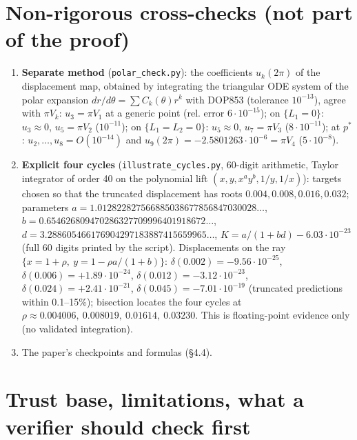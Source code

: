\documentclass[11pt,a4paper]{report}
\begin{document}
\section{Non-rigorous cross-checks (not part of the proof)}

\begin{enumerate}
\def\labelenumi{\arabic{enumi}.}
\tightlist
\item
  \textbf{Separate method} (\texttt{polar\_check.py}): the coefficients \(u_k(2\pi)\) of the displacement map, obtained
  by integrating the triangular ODE system of the polar expansion \(dr/d\theta=\sum C_k(\theta)r^k\) with DOP853
  (tolerance \(10^{-13}\)), agree with \(\pi V_k\): \(u_3=\pi V_1\) at a generic point (rel. error
  \(6\cdot10^{-15}\)); on \(\{L_1=0\}\): \(u_3\approx0\), \(u_5=\pi V_2\) (\(10^{-11}\)); on \(\{L_1=L_2=0\}\):
  \(u_5\approx0\), \(u_7=\pi V_3\) (\(8\cdot10^{-11}\)); at \(p^*\): \(u_2,\dots,u_8=O(10^{-14})\) and
  \(u_9(2\pi)=-2.5801263\cdot10^{-6}=\pi V_4\) (\(5\cdot10^{-8}\)).
\item
  \textbf{Explicit four cycles} (\texttt{illustrate\_cycles.py}, 60-digit arithmetic, Taylor integrator of order 40 on the
  polynomial lift \((x,y,x^ay^b,1/y,1/x)\)): targets chosen so that the truncated displacement has roots
  \(0.004,0.008,0.016,0.032\); parameters
  \(a=1.012822827566885038677856847030028\ldots\), \(b=0.654626809470286327709996401918672\ldots\),
  \(d=3.288605466176904297183887415659965\ldots\), \(K=a/(1+bd)-6.03\cdot10^{-23}\) (full 60 digits printed by
  the script). Displacements on the ray \(\{x=1+\rho,\ y=1-\rho a/(1+b)\}\):
  \(\delta(0.002)=-9.56\cdot10^{-25}\), \(\delta(0.006)=+1.89\cdot10^{-24}\), \(\delta(0.012)=-3.12\cdot10^{-23}\),
  \(\delta(0.024)=+2.41\cdot10^{-21}\), \(\delta(0.045)=-7.01\cdot10^{-19}\) (truncated predictions within 0.1--15\%);
  bisection locates the four cycles at \(\rho\approx0.004006,\ 0.008019,\ 0.01614,\ 0.03230\). This is floating-point
  evidence only (no validated integration).
\item
  The paper's checkpoints and formulas (§4.4).
\end{enumerate}

\section{Trust base, limitations, what a verifier should check first}
\end{document}
